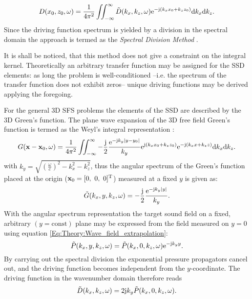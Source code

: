\begin{equation}
D(x_0,z_0,\omega) = \frac{1}{4\pi^2} \iint_{-\infty}^{\infty} \tilde{D}(k_x,k_z, \omega) \mathrm{e}^{-\mathrm{j} (k_x x_0 + k_z z_0)} \mathrm{d} k_x \mathrm{d} k_z.
\label{Eq:Theory:Dkx_inverse_Fourier}
\end{equation}
Since the driving function spectrum is yielded by a division in the spectral domain the approach is termed as the \emph{Spectral Division Method} \cite{Ahrens2010a, Ahrens2012:Ambisonics_for_planar_linear, Ahrens2011:icassp, Ahrens2010:Ambisonics_w_planar_linear}.

It is shall be noticed, that this method does not give a constraint on the integral kernel. Theoretically an arbitrary transfer function may be assigned for the SSD elements: as long the problem is well-conditioned --i.e. the spectrum of the transfer function does not exhibit zeros-- unique driving functions may be derived applying the foregoing.

\vspace{3mm}
For the general 3D SFS problems the elements of the SSD are described by the 3D Green's function. The plane wave expansion of the 3D free field Green's function is termed as the Weyl's integral representation \cite{Williams1999, Lalor1969}:
\begin{equation}
G(\mathbf{x} - \mathbf{x}_0,\omega ) = \frac{1}{4\pi^2} \iint_{-\infty}^{\infty} -\frac{\mathrm{j}}{2}\frac{\mathrm{e}^{ -\mathrm{j} k_y  | y - y_0 |  }}{ k_y }
\mathrm{e}^{\mathrm{j} (k_x x_0 + k_z z_0)} \mathrm{e}^{-\mathrm{j} (k_x x + k_z z)} \mathrm{d} k_x \mathrm{d} k_z.
\label{Eq:Theory:Weyls_integral}
\end{equation}
with $k_y = \sqrt{ \left( \frac{\omega}{c} \right )^2 - k_x^2 - k_z^2 }$, thus the angular spectrum of the Green's function placed at the origin ($\mathbf{x}_0 = [0,\ 0,\ 0]^{\mathrm{T}}$) measured at a fixed $y$ is given as:
\begin{equation}
\tilde{G}(k_x,y,k_z,\omega) =-\frac{\mathrm{j}}{2}\frac{\mathrm{e}^{ -\mathrm{j} k_y  | y |  }}{ k_y }.
\end{equation}
With the angular spectrum representation the target sound field on a fixed, arbitrary $(y=\mathrm{const})$ plane may be expressed from the field measured on $y=0$ using equation \eqref{Eq:Theory:Wave_field_extrapolation}:
\begin{equation}
\tilde{P}(k_x,y,k_z,\omega) = \tilde{P}(k_x,0,k_z,\omega) \mathrm{e}^{- \mathrm{j} k_y y}.
\label{Eq:Theory:Wave_field_extrapolation_2}
\end{equation}
By carrying out the spectral division the exponential pressure propagators cancel out, and the driving function becomes independent from the $y$-coordinate. The driving function in the wavenumber domain therefore reads
\begin{equation}
\tilde{D}(k_x,k_z,\omega) = 2\mathrm{j} k_y \tilde{P}(k_x,0,k_z,\omega).
\label{Eq:Theory:Planar_explicit_driv_fun}
\end{equation}

